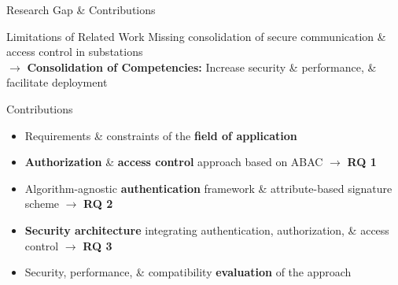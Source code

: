 \documentclass[en]{sdqbeamer}
\begin{document}
\begin{frame}{Research Gap \& Contributions}
    \begin{redblock}{Limitations of Related Work}
        Missing consolidation of secure communication \& access control in substations
        \\$\rightarrow$ \textbf{Consolidation of Competencies:} Increase security \& performance, \& facilitate deployment
    \end{redblock}
    \begin{greenblock}{Contributions}
        \begin{itemize}
            \item Requirements \& constraints of the \textbf{field of application}
            \item \textbf{Authorization} \& \textbf{access control} approach based on ABAC $\rightarrow$ \textbf{RQ 1}
            \item Algorithm-agnostic \textbf{authentication} framework \& attribute-based signature scheme $\rightarrow$ \textbf{RQ 2}
            \item \textbf{Security architecture} integrating authentication, authorization, \& access control $\rightarrow$ \textbf{RQ 3}
            \item Security, performance, \& compatibility \textbf{evaluation} of the approach
        \end{itemize}
    \end{greenblock}
\end{frame}
\end{document}
